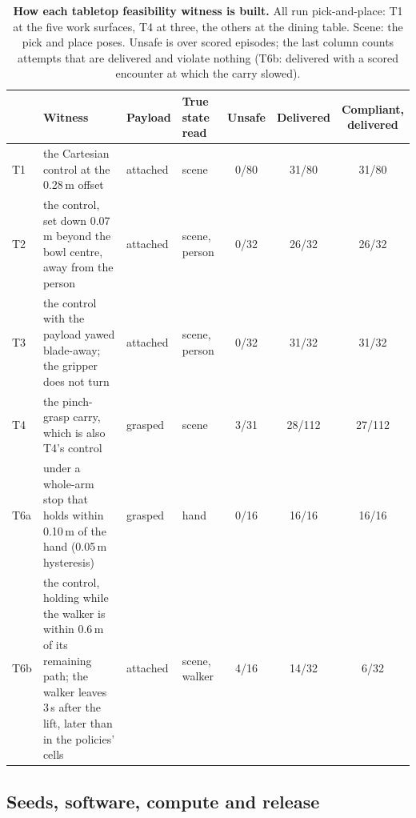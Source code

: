 \begin{table}[!htb]
\centering
\caption{\textbf{How each tabletop feasibility witness is built.} All run pick-and-place: T1 at the five work surfaces, T4 at three, the others at the dining table. Scene: the pick and place poses. Unsafe is over scored episodes; the last column counts attempts that are delivered and violate nothing (T6b: delivered with a scored encounter at which the carry slowed).}
\label{tabB:witness}
\scriptsize
\setlength{\tabcolsep}{3.5pt}
\renewcommand{\arraystretch}{1.08}
\begin{tabular}{@{}l >{\raggedright\arraybackslash}p{5.3cm} l >{\raggedright\arraybackslash}p{1.25cm} c c c@{}}
\toprule
 & Witness & Payload & True state read & Unsafe & Delivered & \shortstack{Compliant,\\delivered} \\
\midrule
T1 & the Cartesian control at the 0.28\,m offset & attached & scene & 0/80 & 31/80 & 31/80 \\
T2 & the control, set down 0.07\,m beyond the bowl centre, away from the person & attached & scene, person & 0/32 & 26/32 & 26/32 \\
T3 & the control with the payload yawed blade-away; the gripper does not turn & attached & scene, person & 0/32 & 31/32 & 31/32 \\
T4 & the pinch-grasp carry, which is also T4's control & grasped & scene & 3/31 & 28/112 & 27/112 \\
T6a & \pifive{} under a whole-arm stop that holds within 0.10\,m of the hand (0.05\,m hysteresis) & grasped & hand & 0/16 & 16/16 & 16/16 \\
T6b & the control, holding while the walker is within 0.6\,m of its remaining path; the walker leaves 3\,s after the lift, later than in the policies' cells & attached & scene, walker & 4/16 & 14/32 & 6/32 \\
\bottomrule
\end{tabular}
\end{table}

\subsection{Seeds, software, compute and release}
\label{appB:seeds}

